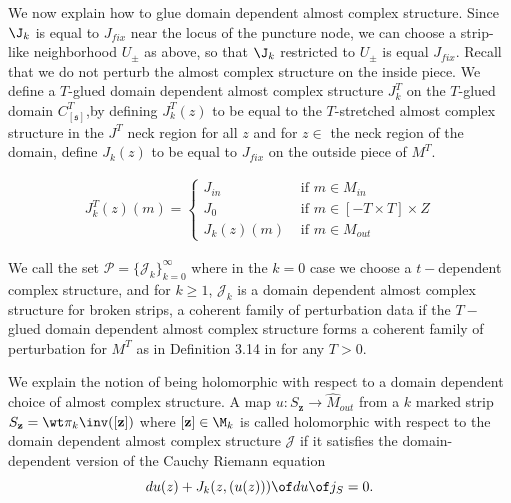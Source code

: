 We now explain how to glue domain dependent almost complex structure. Since $\J_k$ is equal to $J_{fix}$ near the locus of the puncture node, we can choose a strip-like neighborhood $U_\pm$ as above, so that $\J_k$ restricted to $U_\pm$ is equal $J_{fix}$. Recall that we do not perturb the almost complex structure on the inside piece. We define a $T$-glued domain dependent almost complex structure $J^T_k$ on the $T$-glued domain $C^T_{[\mathfrak{s}]}$,by defining $J^T_k(z)$ to be equal to the $T$-stretched almost complex structure in the $J^T$ neck region for all $z$ and for $z\in$ the neck region of the domain, define $J_k(z)$ to be equal to $J_{fix}$ on the outside piece of $M^T$.

\begin{align*}
    J^T_k(z) (m) =
    \begin{cases}
     J_{in}  & \text{ if }  m \in M_{in} \\
     J_0        & \text{ if } m \in [-T\times T] \times Z\\
     J_k(z)(m)    & \text { if } m\in M_{out}
     \end{cases}
\end{align*}




\begin{defn}
We call the set $\mathcal{P} = \{ \mathcal{J}_k \}_{k=0}^{\infty}$ where in the $k=0$ case we choose a $t-$dependent complex structure, and for $k\geq 1$,  $\mathcal{J}_k$ is a domain dependent almost complex structure for broken strips, a coherent family of perturbation data if the $T-$glued domain dependent almost complex structure forms a coherent family of perturbation for $M^T$ as in Definition 3.14 in \cite{charwoodstabil} for any $T>0$.

\end{defn}



We explain the notion of being holomorphic with respect to a domain dependent choice of almost complex structure.  A map $u:S_{\textbf{z}} \to \widehat M_{out}$  from a $k$ marked strip $S_{\textbf{z}} = \wt \pi_k \inv ([\textbf{z}]) $ where $[\textbf{z}] \in \M_k$ is called  holomorphic with respect to the domain dependent almost complex structure $\mathcal{J}$ if it satisfies the domain-dependent version of the Cauchy Riemann equation 
\begin{equation*}
   du(z) + J_k(z,(u(z)))\of du \of j_S = 0 .
\end{equation*}


